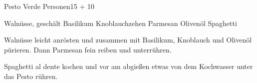 \begin{MyRecipe}{Pesto Verde}{ Personen}{\SI{15}{\minuteprime} + \SI{10}{\minuteprime}}
	
	
	\ingredient[\Calc{0.1}{\x}]{\si{\kilogram}} {Walnüsse, geschält}
	\ingredient[\Calc{1}{\x}]{\si{\Bund}} {Basilikum}
	\ingredient[\Calc{2}{\x}]{} {Knoblauchzehen}
	\ingredient[\Calc{100}{\x}]{\si{\gram}} {Parmesan}
	\ingredient[\Calc{0.1}{\x}]{\si{\liter}} {Olivenöl}
	\ingredient[\Calc{0.6}{\x}]{\si{\kilogram}} {Spaghetti}
	
	Walnüsse leicht anrösten und zusammen mit Basilikum, Knoblauch und Olivenöl pürieren. Dann Parmesan fein reiben und unterrühren.
	
	
	Spaghetti al dente kochen und vor am abgießen etwas von dem Kochwasser unter das Pesto rühren.
	
	
	
\end{MyRecipe}
